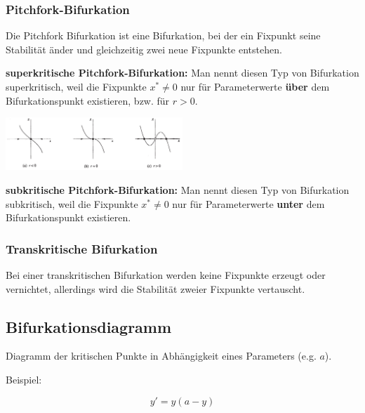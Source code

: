 \begin{multicols}{2}
	\subsubsection{Pitchfork-Bifurkation}
	Die Pitchfork Bifurkation ist eine Bifurkation, bei der ein Fixpunkt seine Stabilität änder und gleichzeitig zwei neue Fixpunkte entstehen. \newline \newline
	
	\textbf{superkritische Pitchfork-Bifurkation:} Man nennt diesen Typ von Bifurkation superkritisch, weil die Fixpunkte $x^* \neq 0$ nur für Parameterwerte \textbf{über} dem Bifurkationspunkt existieren, bzw. für $r >0$.
	
	\includegraphics[width=0.5\textwidth]{./images/superkritisch.png}
	\columnbreak
	
	\textbf{subkritische Pitchfork-Bifurkation:} Man nennt diesen Typ von Bifurkation subkritisch, weil die Fixpunkte $x^* \neq 0$ nur für Parameterwerte \textbf{unter} dem Bifurkationspunkt existieren.
	
	\subsubsection{Transkritische Bifurkation}
	Bei einer transkritischen Bifurkation werden keine Fixpunkte erzeugt oder vernichtet, allerdings wird die Stabilität zweier Fixpunkte vertauscht.
\end{multicols}

\subsection{Bifurkationsdiagramm}
	Diagramm der kritischen Punkte in Abhängigkeit eines Parameters (e.g. $a$).
	
	Beispiel:
	
	\[y'=y(a-y)\]
	
